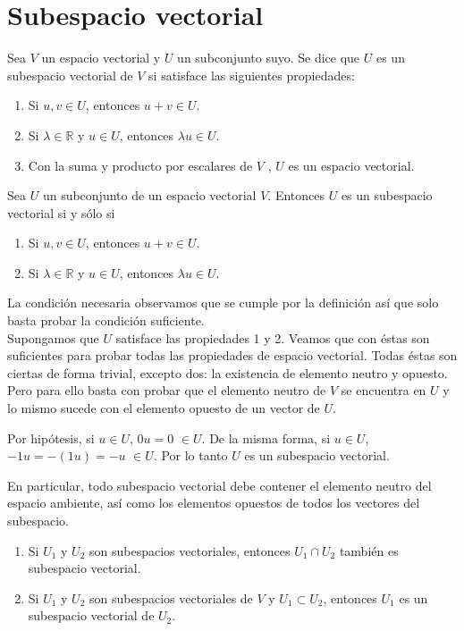 		\section{Subespacio vectorial}
		\begin{defi}
			Sea $V$ un espacio vectorial y $U$ un subconjunto suyo. Se dice que $U$ es un subespacio vectorial de $V$ si satisface las siguientes propiedades:
		\end{defi}
		\begin{enumerate}
			\item Si $u, v \in U$, entonces $u + v \in U$.
			\item Si $\lambda \in \mathbb{R}$ y $u \in U$, entonces $\lambda u \in U$.
			\item Con la suma y producto por escalares de $V$ , $U$ es un espacio vectorial.
		\end{enumerate}
		\begin{pro}
			Sea $ U $ un subconjunto de un espacio vectorial $V$. Entonces $U$ es un subespacio vectorial si y sólo si
		\end{pro}
		\begin{enumerate}
			\item Si $u, v \in U$, entonces $u + v \in U$.
			\item Si $\lambda \in \mathbb{R}$ y $u \in U$, entonces $\lambda u \in U$.
		\end{enumerate}
		\begin{demo}
			La condición necesaria observamos que se cumple por la definición así que solo basta probar la condición suficiente.\\
			Supongamos que $U$ satisface las propiedades 1 y 2. Veamos que con éstas son suficientes para probar todas las propiedades de espacio vectorial. Todas éstas son ciertas de forma trivial, excepto dos: la existencia de elemento neutro y opuesto. Pero para ello basta con probar que el elemento neutro de $V$ se encuentra en $U$ y lo mismo sucede con el elemento opuesto de un vector de $U$.
		
			Por hipótesis, si $u\in U$, $0u = 0$  $\in U$. De la misma forma, si $u \in U$, $ -1u = -(1u) = -u $ $\in U$.
			Por lo tanto $U$ es un subespacio vectorial.
		\end{demo}
		En particular, todo subespacio vectorial debe contener el elemento neutro del
		espacio ambiente, así como los elementos opuestos de todos los vectores del subespacio.\\[0.3cm]
	\begin{pro}
			\begin{enumerate}
			\item Si $U_1$ y $U_2$ son subespacios vectoriales, entonces $U_1\cap U_2$
			también es subespacio vectorial.
			\item Si $U_1$ y $U_2$ son subespacios vectoriales de $V$ y $U_1 \subset U_2$, entonces $U_1$ es un subespacio vectorial de $U_2$.
		\end{enumerate}
	\end{pro}
